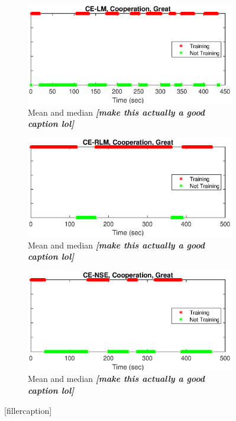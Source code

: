 \begin{figure}[ht]
\begin{subfigure}{\linewidth}
\centering
\includegraphics[scale=0.8]{figures/flight_results/coop_great_lm_trainRate.eps}
\caption{Mean and median \textit{\textbf{[make this actually a good caption lol]}}}
\label{fig:flightCoopGreatMeanMed}
\end{subfigure} 
\begin{subfigure}{\linewidth}
\centering
\includegraphics[scale=0.8]{figures/flight_results/coop_great_rlm_trainRate.eps}
\caption{Mean and median \textit{\textbf{[make this actually a good caption lol]}}}
\label{fig:flightCoopGoodMeanMed}
\end{subfigure}
\begin{subfigure}{\linewidth}
\centering
\includegraphics[scale=0.8]{figures/flight_results/coop_great_nse_trainRate.eps}
\caption{Mean and median \textit{\textbf{[make this actually a good caption lol]}}}
\label{fig:flightCoopGoodUnweightSum}
\end{subfigure}

\caption{[fillercaption]}
\label{fig:trainingTimeSeries}
\end{figure}

